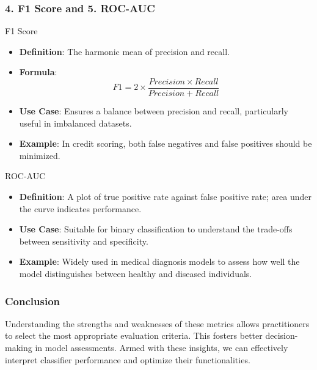 \documentclass[aspectratio=169]{beamer}
\begin{document}
\begin{frame}[fragile]
    \frametitle{4. F1 Score and 5. ROC-AUC}
    \begin{block}{F1 Score}
        \begin{itemize}
            \item \textbf{Definition}: The harmonic mean of precision and recall.
            \item \textbf{Formula}:
            \begin{equation}
                F1 = 2 \times \frac{Precision \times Recall}{Precision + Recall}
            \end{equation}
            \item \textbf{Use Case}: Ensures a balance between precision and recall, particularly useful in imbalanced datasets.
            \item \textbf{Example}: In credit scoring, both false negatives and false positives should be minimized.
        \end{itemize}
    \end{block}

    \begin{block}{ROC-AUC}
        \begin{itemize}
            \item \textbf{Definition}: A plot of true positive rate against false positive rate; area under the curve indicates performance.
            \item \textbf{Use Case}: Suitable for binary classification to understand the trade-offs between sensitivity and specificity.
            \item \textbf{Example}: Widely used in medical diagnosis models to assess how well the model distinguishes between healthy and diseased individuals.
        \end{itemize}
    \end{block}
\end{frame}

\begin{frame}[fragile]
    \frametitle{Conclusion}
    Understanding the strengths and weaknesses of these metrics allows practitioners to select the most appropriate evaluation criteria. This fosters better decision-making in model assessments. Armed with these insights, we can effectively interpret classifier performance and optimize their functionalities.
\end{frame}
\end{document}
